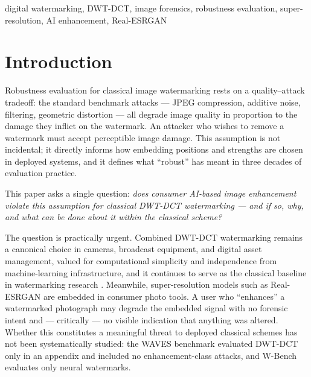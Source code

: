 \documentclass[conference]{IEEEtran}
\begin{document}
\begin{IEEEkeywords}
digital watermarking, DWT-DCT, image forensics, robustness evaluation,
super-resolution, AI enhancement, Real-ESRGAN
\end{IEEEkeywords}

\section{Introduction}
\label{sec:intro}

Robustness evaluation for classical image watermarking rests on a
quality--attack tradeoff: the standard benchmark attacks --- JPEG
compression, additive noise, filtering, geometric distortion
\cite{petitcolas1998,cox2007} --- all degrade image quality in
proportion to the damage they inflict on the watermark. An attacker
who wishes to remove a watermark must accept perceptible image damage.
This assumption is not incidental; it directly informs how embedding
positions and strengths are chosen in deployed systems, and it defines
what ``robust'' has meant in three decades of evaluation practice.

This paper asks a single question: \emph{does consumer AI-based image
enhancement violate this assumption for classical DWT-DCT
watermarking --- and if so, why, and what can be done about it within
the classical scheme?}

The question is practically urgent. Combined DWT-DCT watermarking
\cite{alhaj2007} remains a canonical choice in cameras, broadcast
equipment, and digital asset management, valued for computational
simplicity and independence from machine-learning infrastructure, and
it continues to serve as the classical baseline in watermarking
research \cite{waves2024}. Meanwhile, super-resolution models such as
Real-ESRGAN \cite{realesrgan2021} are embedded in consumer photo
tools. A user who ``enhances'' a watermarked photograph may degrade
the embedded signal with no forensic intent and --- critically --- no
visible indication that anything was altered. Whether this constitutes
a meaningful threat to deployed classical schemes has not been
systematically studied: the WAVES benchmark \cite{waves2024} evaluated
DWT-DCT only in an appendix and included no enhancement-class attacks,
and W-Bench \cite{wbench2024} evaluates only neural watermarks.
\end{document}
